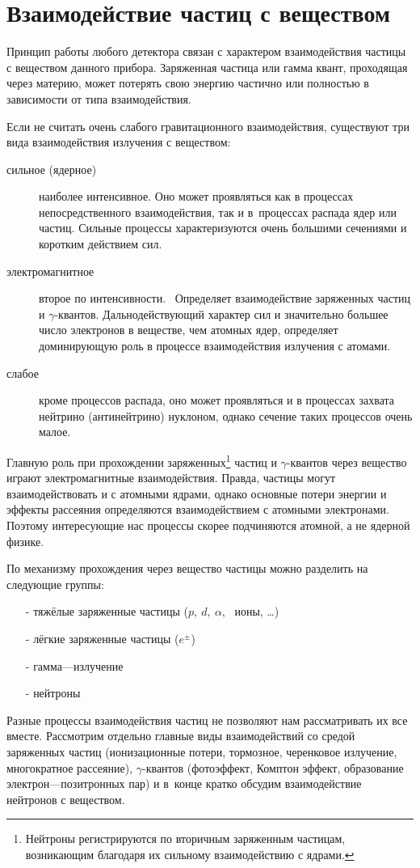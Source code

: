 \section{Взаимодействие частиц с веществом}
Принцип работы любого детектора связан с характером взаимодействия
частицы с веществом данного прибора. Заряженная частица или гамма квант,
проходящая  через материю, может потерять свою энергию частично или
полностью в зависимости от типа взаимодействия.

Если не считать очень слабого гравитационного взаимодействия, существуют
три вида взаимодействия излучения с веществом:
\begin{description}
\item[сильное (ядерное)] наиболее интенсивное. Оно может
проявляться как в процессах непосредственного взаимодействия, так и
в~процессах распада ядер или частиц. Сильные процессы характеризуются
очень большими сечениями и коротким действием сил.
\item[электромагнитное] второе по интенсивности. ~Определяет
взаимодействие заряженных частиц и $\gamma$-квантов. Дальнодействующий
характер сил и значительно большее число электронов в веществе, чем
атомных ядер, определяет доминирующую роль в процессе взаимодействия
излучения с атомами.
\item[слабое] кроме процессов распада, оно может проявляться и в
процессах захвата нейтрино (антинейтрино) нуклоном, однако сечение таких
процессов очень малое.
\end{description}

Главную роль при прохождении заряженных\footnote{Нейтроны
регистрируются по вторичным заряженным частицам, возникающим благодаря
их сильному взаимодействию с ядрами.}
частиц и $\gamma$-квантов через вещество играют электромагнитные
взаимодействия. Правда, частицы могут взаимодействовать и с атомными
ядрами, однако основные потери энергии и эффекты рассеяния определяются
взаимодействием с атомными электронами. Поэтому интересующие нас
процессы скорее подчиняются атомной, а не ядерной физике.

По механизму прохождения через вещество частицы можно разделить
на следующие группы:
\begin{itemize}
\item[-] тяжёлые заряженные частицы ($p,~d,~\alpha$,~ ионы, \dots)
\item[-] лёгкие заряженные частицы ($e^\pm$)
\item[-] гамма---излучение
\item[-] нейтроны
\end{itemize}
\clearpage
Разные процессы взаимодействия частиц не позволяют нам рассматривать их
все вместе. Рассмотрим отдельно главные виды взаимодействий со средой
заряженных частиц (ионизационные потери, тормозное, черенковое излучение,
многократное рассеяние), $\gamma$-квантов (фотоэффект, Комптон эффект,
образование электрон---позитронных пар) и в~конце кратко обсудим
взаимодействие нейтронов с веществом.

